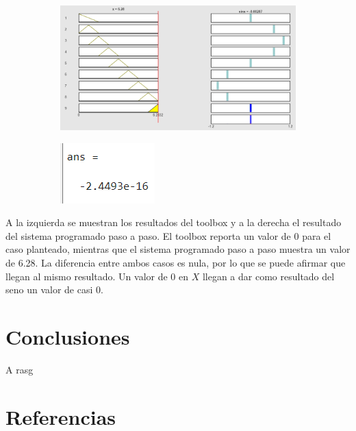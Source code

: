 \documentclass[11pt, letterpaper]{article}
\begin{document}
\begin{figure}[h]
	\centering
	\begin{subfigure}{0.40\textwidth} %
		\centering
		\includegraphics[width=1.4\textwidth]{IMG/RP13.png}
		\label{fig:G7}
	\end{subfigure}
	\hfill
	\begin{subfigure}{0.42\textwidth} %
		\centering
		\includegraphics[width=0.4\textwidth]{IMG/M13.png}
		\label{fig:G8}
	\end{subfigure}
	\label{fig:comparacion4}
\end{figure}

A la izquierda se muestran los resultados del toolbox y a la derecha el resultado del sistema programado paso a paso. El toolbox reporta un valor de 0 para el caso planteado, mientras que el sistema programado paso a paso muestra un valor de 6.28. La diferencia entre ambos casos es nula, por lo que se puede afirmar que llegan al mismo resultado. Un valor de 0 en $X$ llegan a dar como resultado del seno un valor de casi 0.


\section{Conclusiones}

A rasg
\newpage

\section{Referencias}
\end{document}
